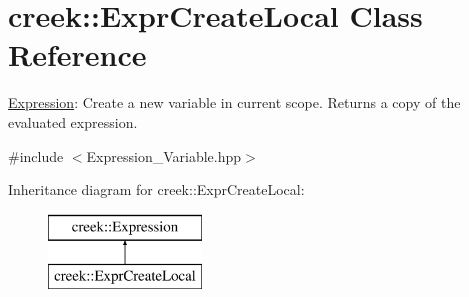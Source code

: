 \hypertarget{classcreek_1_1_expr_create_local}{}\section{creek\+:\+:Expr\+Create\+Local Class Reference}
\label{classcreek_1_1_expr_create_local}


\hyperlink{classcreek_1_1_expression}{Expression}\+: Create a new variable in current scope. Returns a copy of the evaluated expression.  




{\ttfamily \#include $<$Expression\+\_\+\+Variable.\+hpp$>$}

Inheritance diagram for creek\+:\+:Expr\+Create\+Local\+:\begin{figure}[H]
\begin{center}
\leavevmode
\includegraphics[height=2.000000cm]{classcreek_1_1_expr_create_local}
\end{center}
\end{figure}
